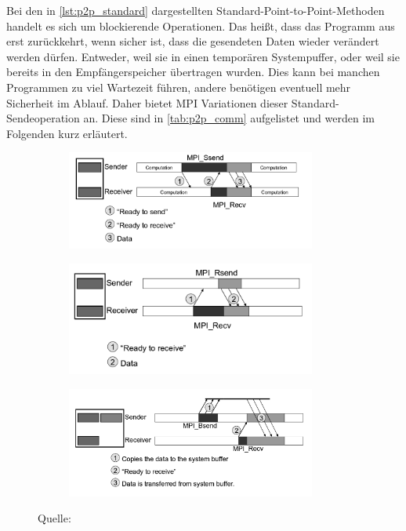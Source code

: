     Bei den in \autoref{lst:p2p_standard} dargestellten Standard-Point-to-Point-Methoden handelt es sich um blockierende Operationen. Das heißt, dass das Programm aus  
    erst zurückkehrt, wenn sicher ist, dass die gesendeten Daten wieder verändert werden dürfen. Entweder, weil sie in einen temporären Systempuffer, oder weil sie bereits in den 
    Empfängerspeicher übertragen wurden.
    Dies kann bei manchen Programmen zu viel Wartezeit führen, andere benötigen eventuell mehr Sicherheit im Ablauf. Daher bietet MPI Variationen dieser Standard-Sendeoperation an. 
    Diese sind in \autoref{tab:p2p_comm} aufgelistet und werden im Folgenden kurz erläutert.
    
    \begin{figure}[t]
      \begin{subfigure}[c]{0.53\textwidth}
	\includegraphics[width=0.9\textwidth]{img/SyncSend_gray.png}
	\label{fig:sync_send}
      \end{subfigure}
      \begin{subfigure}[c]{0.45\textwidth}
	\includegraphics[width=0.9\textwidth]{img/ReadySend_gray.png}
	\label{fig:ready_send}
      \end{subfigure}
      \begin{subfigure}[c]{0.5\textwidth}
	\includegraphics[width=0.9\textwidth]{img/BufferedSend_gray.png}
	\label{fig:buff_send}
      \end{subfigure}
      \caption{Quelle: \citet{mpi_p2p}}
      \label{fig:send_var}
    \end{figure}
    
